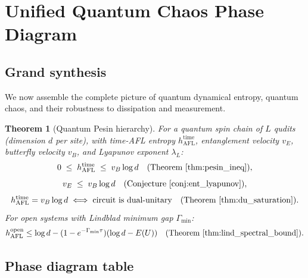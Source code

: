 \documentclass[12pt,a4paper]{article}
\newtheorem{theorem}{Theorem}[section]
\begin{document}
\section{Unified Quantum Chaos Phase Diagram}
\label{sec:unified}

\subsection{Grand synthesis}

We now assemble the complete picture of quantum dynamical entropy, quantum
chaos, and their robustness to dissipation and measurement.

\begin{theorem}[Quantum Pesin hierarchy]
\label{thm:pesin_hierarchy_final}
For a quantum spin chain of $L$ qudits (dimension $d$ per site), with
time-AFL entropy $h_{\mathrm{AFL}}^{\mathrm{time}}$, entanglement velocity
$v_E$, butterfly velocity $v_B$, and Lyapunov exponent $\lambda_L$:
\[
  0
  \;\leq\;
  h_{\mathrm{AFL}}^{\mathrm{time}}
  \;\leq\;
  v_B\log d
  \quad\text{(Theorem~\ref{thm:pesin_ineq})},
\]
\[
  v_E
  \;\leq\;
  v_B\log d
  \quad\text{(Conjecture~\ref{conj:ent_lyapunov})},
\]
\[
  h_{\mathrm{AFL}}^{\mathrm{time}}
  = v_B\log d
  \iff \text{circuit is dual-unitary}
  \quad\text{(Theorem~\ref{thm:du_saturation})}.
\]
For open systems with Lindblad minimum gap $\Gamma_{\min}$:
\[
  h_{\mathrm{AFL}}^{\mathrm{open}}
  \leq \log d - (1-e^{-\Gamma_{\min}\tau})(\log d - E(U))
  \quad\text{(Theorem~\ref{thm:lind_spectral_bound})}.
\]
\end{theorem}

\subsection{Phase diagram table}
\end{document}
